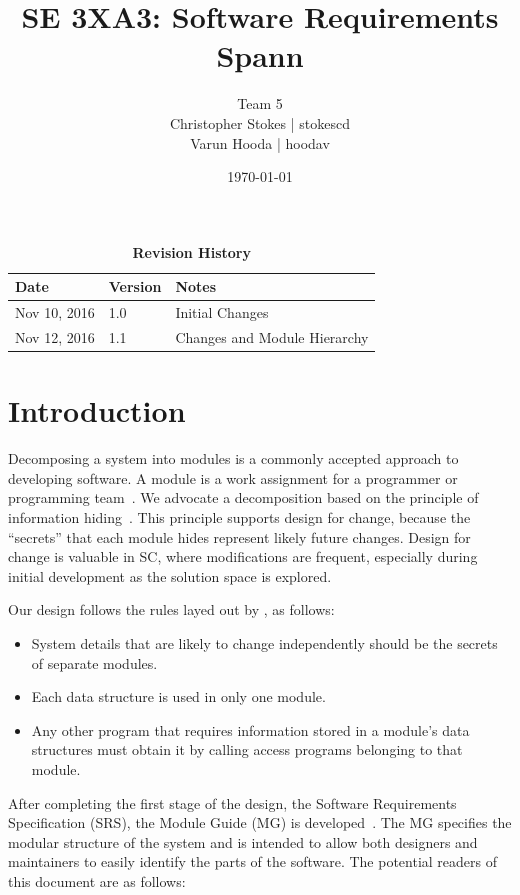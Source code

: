 \documentclass[12pt, titlepage]{article}
\title{SE 3XA3: Software Requirements\\Spann}
\author{Team 5
		\\ Christopher Stokes | stokescd
		\\ Varun Hooda | hoodav
}
\date{\today}
\begin{document}
\maketitle

\tableofcontents
\listoftables
\listoffigures

\begin{table}[bp]
\caption{\bf Revision History}
\begin{tabularx}{\textwidth}{p{3cm}p{2cm}X}
\toprule {\bf Date} & {\bf Version} & {\bf Notes}\\
\midrule
  Nov 10, 2016 & 1.0 & Initial Changes\\
  Nov 12, 2016 & 1.1 & Changes and Module Hierarchy\\
\bottomrule
\end{tabularx}
\end{table}

\newpage


\section{Introduction}

Decomposing a system into modules is a commonly accepted approach to developing
software.  A module is a work assignment for a programmer or programming
team~\citep{ParnasEtAl1984}.  We advocate a decomposition
based on the principle of information hiding~\citep{Parnas1972a}.  This
principle supports design for change, because the ``secrets'' that each module
hides represent likely future changes.  Design for change is valuable in SC,
where modifications are frequent, especially during initial development as the
solution space is explored.

Our design follows the rules layed out by \citet{ParnasEtAl1984}, as follows:
\begin{itemize}
\item System details that are likely to change independently should be the
  secrets of separate modules.
\item Each data structure is used in only one module.
\item Any other program that requires information stored in a module's data
  structures must obtain it by calling access programs belonging to that module.
\end{itemize}

After completing the first stage of the design, the Software Requirements
Specification (SRS), the Module Guide (MG) is developed~\citep{ParnasEtAl1984}. The MG
specifies the modular structure of the system and is intended to allow both
designers and maintainers to easily identify the parts of the software.  The
potential readers of this document are as follows:
\end{document}

